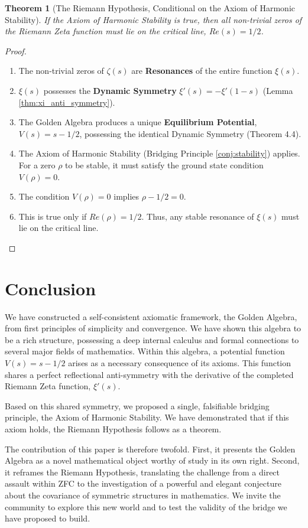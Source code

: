 \documentclass{article}
\theoremstyle{plain}
\newtheorem{theorem}{Theorem}[section]
\theoremstyle{definition}
\theoremstyle{remark}
\begin{document}
\begin{theorem}[The Riemann Hypothesis, Conditional on the Axiom of Harmonic Stability]
If the Axiom of Harmonic Stability is true, then all non-trivial zeros of the Riemann Zeta function must lie on the critical line, $Re(s)=1/2$.
\end{theorem}
\begin{proof}
\begin{enumerate}
    \item The non-trivial zeros of $\zeta(s)$ are \textbf{Resonances} of the entire function $\xi(s)$.
    \item $\xi(s)$ possesses the \textbf{Dynamic Symmetry} $\xi'(s) = -\xi'(1-s)$ (Lemma \ref{thm:xi_anti_symmetry}).
    \item The Golden Algebra produces a unique \textbf{Equilibrium Potential}, $V(s) = s - 1/2$, possessing the identical Dynamic Symmetry (Theorem 4.4).
    \item The Axiom of Harmonic Stability (Bridging Principle \ref{conj:stability}) applies. For a zero $\rho$ to be stable, it must satisfy the ground state condition $V(\rho)=0$.
    \item The condition $V(\rho)=0$ implies $\rho - 1/2 = 0$.
    \item This is true only if $Re(\rho) = 1/2$. Thus, any stable resonance of $\xi(s)$ must lie on the critical line.
\end{enumerate}
\end{proof}

\section{Conclusion}
We have constructed a self-consistent axiomatic framework, the Golden Algebra, from first principles of simplicity and convergence. We have shown this algebra to be a rich structure, possessing a deep internal calculus and formal connections to several major fields of mathematics. Within this algebra, a potential function $V(s) = s - 1/2$ arises as a necessary consequence of its axioms. This function shares a perfect reflectional anti-symmetry with the derivative of the completed Riemann Zeta function, $\xi'(s)$.

Based on this shared symmetry, we proposed a single, falsifiable bridging principle, the Axiom of Harmonic Stability. We have demonstrated that if this axiom holds, the Riemann Hypothesis follows as a theorem.

The contribution of this paper is therefore twofold. First, it presents the Golden Algebra as a novel mathematical object worthy of study in its own right. Second, it reframes the Riemann Hypothesis, translating the challenge from a direct assault within ZFC to the investigation of a powerful and elegant conjecture about the covariance of symmetric structures in mathematics. We invite the community to explore this new world and to test the validity of the bridge we have proposed to build.
\end{document}
